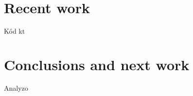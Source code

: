 \documentclass[11pt,slovak,a4paper,twoside]{article}
\begin{document}
\section{Recent work} \label{recentWork}

Kód kt


\section{Conclusions and next work} \label{conclusions}

Analyzo
 


\end{document}
